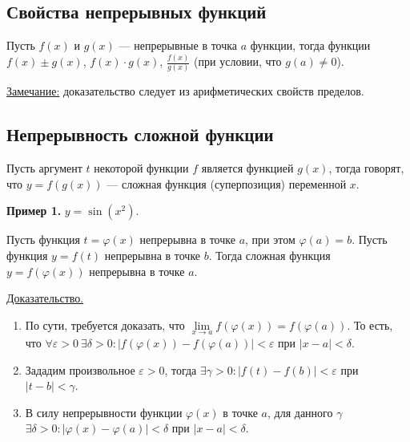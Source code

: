 \documentclass{article}
\begin{document}
\subsection{Свойства непрерывных функций}
\begin{theorem}
    Пусть \(f(x)\) и \(g(x)\) --- непрерывные в точка \(a\) функции, тогда функции \(\displaystyle f(x) \pm g(x)\), \(\displaystyle f(x) \cdot g(x)\), \(\displaystyle \frac{f(x)}{g(x)}\) (при условии, что \(g(a) \neq 0\)).       
\end{theorem}
\noindent
\underline{Замечание:} доказательство следует из арифметических свойств пределов.

\subsection{Непрерывность сложной функции}
\begin{definition}
    Пусть аргумент \(t\) некоторой функции \(f\) является функцией \(g(x)\), тогда говорят, что \(y = f(g(x))\) --- сложная функция (суперпозиция) переменной \(x\).
\end{definition}
\noindent
\textbf{Пример 1.} \(y = \sin(x^2)\).

\begin{theorem}
    Пусть функция \(t = \varphi(x)\) непрерывна в точке \(a\), при этом \(\varphi(a) = b\). Пусть функция \(y = f(t)\) непрерывна в точке \(b\). 
    Тогда сложная функция \(y = f(\varphi(x))\) непрерывна в точке \(a\).      
\end{theorem}
\noindent
\underline{Доказательство.} 
\begin{enumerate}
    \item По сути, требуется доказать, что \(\lim\limits_{x \to a}f(\varphi(x)) = f(\varphi(a))\). То есть, что \(\forall \varepsilon > 0\ \exists \delta > 0: \vert f(\varphi(x)) - f(\varphi(a)) \vert < \varepsilon\) при \(\vert x - a \vert < \delta \).
    \item Зададим произвольное \(\varepsilon > 0\), тогда \(\exists \gamma > 0: \vert f(t) - f(b) \vert < \varepsilon\) при \(\vert t - b \vert < \gamma\).
    \item В силу непрерывности функции \(\varphi(x)\) в точке \(a\), для данного \(\gamma\) \(\exists \delta > 0: \vert \varphi(x) - \varphi(a) \vert < \delta\) при \(\vert x - a \vert < \delta\).
\end{enumerate}
\end{document}

